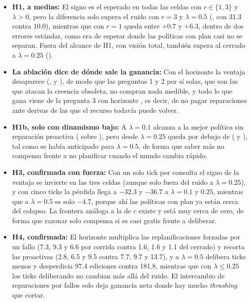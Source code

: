 \begin{itemize}[leftmargin=1.4em, itemsep=0.2em]
  \item \textbf{H1, a medias:} El signo es el esperado en todas las celdas con $r \in \{1,3\}$ y $\lambda>0$, pero la diferencia solo supera el ruido con $r=3$ y $\lambda=0.5$ (, con 31.3 contra 10.0), mientras que con $r=1$ queda entre $+0.7$ y $+6.3$, dentro de dos errores estándar, como era de esperar donde las políticas con plan casi no se separan. Fuera del alcance de H1, con visión total, \KB{} también supera al cerrado a $\lambda=0.25$ ().
  \item \textbf{La ablación dice de dónde sale la ganancia:} Con el horizonte \ahora{} la ventaja desaparece (,  y ), de modo que las preguntas 1 y 2 por sí solas, que son las que atacan la creencia obsoleta, no compran nada medible, y todo lo que gana \KB{} viene de la pregunta 3 con horizonte \llegada, es decir, de no pagar reparaciones ante derivas de las que el recurso todavía puede volver.
  \item \textbf{H1b, solo con dinamismo bajo:} A $\lambda=0.1$ alcanza a la mejor política sin reparación proactiva ( sobre \OL), pero desde $\lambda=0.25$ queda por debajo de \MB{} ( y ), tal como se había anticipado para $\lambda=0.5$, de forma que saber más no compensa frente a no planificar cuando el mundo cambia rápido.
  \item \textbf{H3, confirmada con fuerza:} Con un solo tick por consulta el signo de la ventaja se invierte en las tres celdas (aunque solo fuera del ruido a $\lambda=0.25$), y con cinco ticks la pérdida llega a $-32.3$ y $-36.7$ a $\lambda=0.1$ y $0.25$, mientras que a $\lambda=0.5$ es solo $-4.7$, porque ahí las políticas con plan ya están cerca del colapso. La frontera análoga a la de $c$ existe y está muy cerca de cero, de forma que razonar solo compensa si es casi gratis frente a deliberar.
  \item \textbf{H4, confirmada:} El horizonte \llegada{} multiplica las replanificaciones forzadas por un fallo (7.3, 9.3 y 6.6 por corrida contra 1.6, 1.6 y 1.1 del cerrado) y recorta las proactivas (2.8, 6.5 y 9.5 contra 7.7, 9.7 y 13.7), y a $\lambda=0.5$ delibera  ticks menos y desperdicia 97.4 ediciones contra 181.8, mientras que con $\lambda\le0.25$ los ticks deliberando no cambian más allá del ruido. El intercambio de reparaciones por fallos solo deja ganancia neta donde hay mucho \emph{thrashing} que cortar.
\end{itemize}

